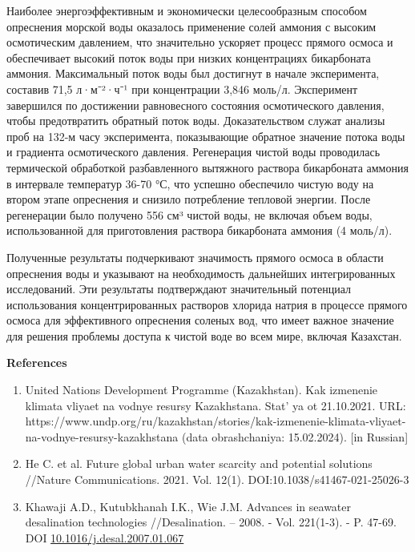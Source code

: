 Наиболее энергоэффективным и экономически целесообразным способом
опреснения морской воды оказалось применение солей аммония с высоким
осмотическим давлением, что значительно ускоряет процесс прямого осмоса
и обеспечивает высокий поток воды при низких концентрациях бикарбоната
аммония. Максимальный поток воды был достигнут в начале эксперимента,
составив 71,5 л·м⁻²·ч⁻¹ при концентрации 3,846 моль/л. Эксперимент
завершился по достижении равновесного состояния осмотического давления,
чтобы предотвратить обратный поток воды. Доказательством служат анализы
проб на 132-м часу эксперимента, показывающие обратное значение потока
воды и градиента осмотического давления. Регенерация чистой воды
проводилась термической обработкой разбавленного вытяжного раствора
бикарбоната аммония в интервале температур 36-70 °С, что успешно
обеспечило чистую воду на втором этапе опреснения и снизило потребление
тепловой энергии. После регенерации было получено 556 см³ чистой воды,
не включая объем воды, использованной для приготовления раствора
бикарбоната аммония (4 моль/л).

Полученные результаты подчеркивают значимость прямого осмоса в области
опреснения воды и указывают на необходимость дальнейших интегрированных
исследований. Эти результаты подтверждают значительный потенциал
использования концентрированных растворов хлорида натрия в процессе
прямого осмоса для эффективного опреснения соленых вод, что имеет важное
значение для решения проблемы доступа к чистой воде во всем мире,
включая Казахстан.

{\bfseries References}

\begin{enumerate}
\def\labelenumi{\arabic{enumi}.}
\item
  United Nations Development Programme (Kazakhstan). Kak izmenenie
  klimata vliyaet na vodnye resursy Kazakhstana. Stat' ya
  ot 21.10.2021. URL:
  https://www.undp.org/ru/kazakhstan/stories/kak-izmenenie-klimata-vliyaet-na-vodnye-resursy-kazakhstana
  (data obrashchaniya: 15.02.2024). {[}in Russian{]}
\item
  He C. et al. Future global urban water scarcity and potential
  solutions //Nature Communications. 2021. Vol. 12(1).
  DOI:10.1038/s41467-021-25026-3
\item
  Khawaji A.D., Kutubkhanah I.K., Wie J.M. Advances in seawater
  desalination technologies //Desalination. -- 2008. - Vol. 221(1-3). -
  P. 47-69. DOI
  \href{http://dx.doi.org/10.1016/j.desal.2007.01.067}{10.1016/j.desal.2007.01.067}
\end{enumerate}


